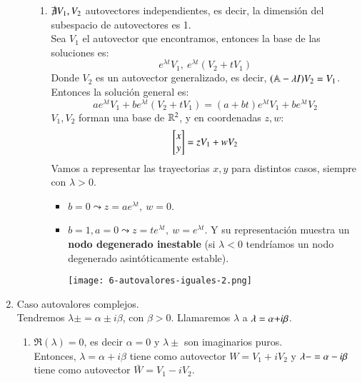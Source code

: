\begin{enumerate}
\begin{enumerate}
\begin{enumerate}
            \item $\not\exists V_1, V_2$ autovectores independientes, es decir, la dimensión del subespacio de autovectores es 1.\\
            Sea $V_1$ el autovector que encontramos, entonces la base de las soluciones es:
            $$
                e^{\lambda t} V_1,\ e^{\lambda t}(V_2 + t V_1)
            $$
            Donde $V_2$ es un autovector generalizado, es decir, $(\mathbb{A} - \lambda I)V_2 = V_1$.
            Entonces la solución general es:
            $$
                ae^{\lambda t} V_1 + b  e^{\lambda t}(V_2 + t V_1) = (a+bt)e^{\lambda t}V_1 + be^{\lambda t}V_2
            $$
            $V_1, V_2$ forman una base de $\mathbb{R}^2$, y en coordenadas $z, w$:
            $$
                \mx{x \\ y } = z V_1 + w V_2
            $$
            Vamos a representar las trayectorias $x, y$ para distintos casos, siempre con $\lambda > 0$.\\
            \begin{itemize}
                \item $b = 0 \leadsto z = ae^{\lambda t},\ w = 0$.
                \item $ b = 1, a = 0 \leadsto z = te^{\lambda t},\ w = e^{\lambda t}$. Y su representación muestra un \textbf{nodo degenerado inestable} (si $\lambda < 0$ tendríamos un nodo degenerado asintóticamente estable).
                \begin{center}
                    \texttt{[image: 6-autovalores-iguales-2.png]}
                \end{center}
            \end{itemize}
        \end{enumerate}
    \end{enumerate}
    \item Caso autovalores complejos.\\
    Tendremos $\lambda \pm = \alpha \pm i \beta$, con $\beta > 0$. Llamaremos $\lambda$ a $\lambda = \alpha \mathbf{+} i\beta$.
    \begin{enumerate}
        \item $\Re(\lambda) = 0$, es decir $\alpha = 0$ y $\lambda \pm$ son imaginarios puros.\\
        Entonces, $\lambda = \alpha + i\beta$ tiene como autovector $W = V_1 + iV_2$ y $\lambda\mathbf{-} = \alpha - i\beta$ tiene como autovector $\bar{W} = V_1 - i V_2$.\\

\end{enumerate}
\end{enumerate}
